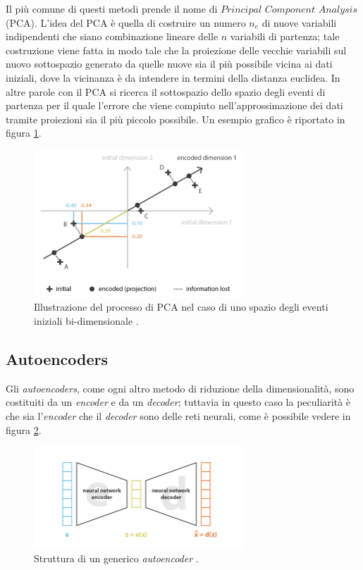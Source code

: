 Il più comune di questi metodi prende il nome di $\textit{Principal Component Analysis}$ (PCA). L'idea del PCA è quella di costruire un numero $\textit{n}_\textit{e}$ di nuove variabili indipendenti che siano combinazione lineare delle $\textit{n}$ variabili di partenza; tale costruzione viene fatta in modo tale che la proiezione delle vecchie variabili sul nuovo sottospazio generato da quelle nuove sia il più possibile vicina ai dati iniziali, dove la vicinanza è da intendere in termini della distanza euclidea. In altre parole con il PCA si ricerca il sottospazio dello spazio degli eventi di partenza per il quale l'errore che viene compiuto nell'approssimazione dei dati tramite proiezioni sia il più piccolo possibile. Un esempio grafico è riportato in figura \ref{PCA}.
\begin{figure}[h!]
	\centering
	\includegraphics[width=0.70\textwidth]{figs/PCA.png}
	\caption{Illustrazione del processo di PCA nel caso di uno spazio degli eventi iniziali bi-dimensionale \cite{Understanding_VAEs}.}
	\label{PCA}
\end{figure}

\newpage


\subsection{Autoencoders}
\label{autoencoders}

Gli \textit{autoencoders}, come ogni altro metodo di riduzione della dimensionalità, sono costituiti da un \textit{encoder} e da un \textit{decoder}; tuttavia in questo caso la peculiarità è che sia l'\textit{encoder} che il \textit{decoder} sono delle reti neurali, come è possibile vedere in figura \ref{autoencoder}. 

\begin{figure}[h!]
	\centering
	\includegraphics[width=0.70\textwidth]{figs/autoencoder.png}
	\caption{Struttura di un generico \textit{autoencoder} \cite{Understanding_VAEs}.}
	\label{autoencoder}
\end{figure}

